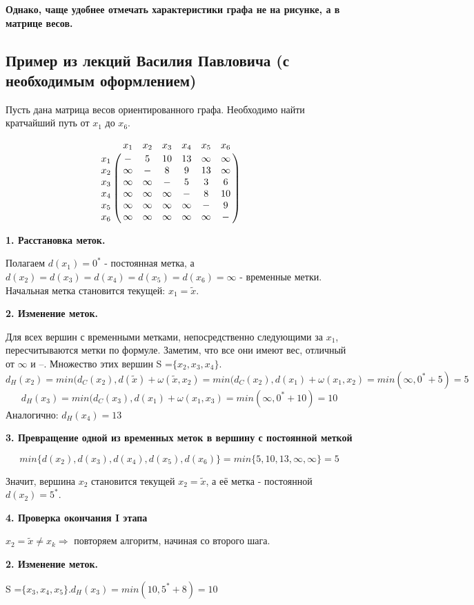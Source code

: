 \documentclass[12pt, a4paper, oneside]{article}
\theoremstyle{plain} %
\theoremstyle{definition}
\begin{document}
\textbf{
Однако, чаще удобнее отмечать характеристики графа не на рисунке, а в матрице весов.
}

\subsection*{Пример из лекций Василия Павловича (с необходимым оформлением)}

Пусть дана матрица весов ориентированного графа. Необходимо найти кратчайший путь от $x_1$ до $x_6$.

\[
 \bordermatrix{ & x_1 & x_2 & x_3 & x_4 & x_5 & x_6 \cr
  x_1 & - & 5 & 10 & 13 & \infty & \infty  \cr
  x_2 & \infty & - & 8 & 9 & 13 & \infty  \cr
  x_3 & \infty & \infty & - & 5 & 3 & 6   \cr
  x_4 & \infty & \infty & \infty & - & 8 & 10  \cr
  x_5 & \infty & \infty & \infty & \infty & - & 9  \cr
  x_6 & \infty & \infty & \infty & \infty & \infty & - } \qquad
\] 

\textbf{1. Расстановка меток.}

Полагаем $d(x_1) = 0^*$ - постоянная метка, а
$d(x_2) = d(x_3) = d(x_4) = d(x_5) = d(x_6) = \infty$ - временные метки. Начальная метка становится текущей: $x_1 = \tilde x$.

\textbf{2. Изменение меток.}

Для всех вершин с временными метками, непосредственно следующими за $x_1$, пересчитываются метки по формуле. Заметим, что все они имеют вес, отличный от $\infty$ и --.
Множество этих вершин S =$\{ x_2, x_3, x_4 \}$.
\[ d_H(x_2) = min(d_C(x_2), d(\tilde x) + \omega(\tilde x, x_2 ) = min(d_C(x_2), d(x_1) + \omega(x_1, x_2 ) = min(\infty, 0^* + 5 ) = 5  \]
\[ d_H(x_3) = min(d_C(x_3), d(x_1) + \omega(x_1, x_3 ) = min(\infty, 0^* + 10 ) = 10  \]
Аналогично: $d_H(x_4) = 13$

\textbf{3. Превращение одной из временных меток в вершину с постоянной меткой }

\[ min\{d(x_2),d(x_3),d(x_4),d(x_5),d(x_6)\} = min\{5,10,13,\infty,\infty\} = 5 \]

Значит, вершина $x_2$ становится текущей $x_2 = \tilde x$, а её метка - постоянной $d(x_2) = 5^*$.

\textbf{4. Проверка окончания I этапа }

$x_2 = \tilde x \neq x_k \Rightarrow$ повторяем алгоритм, начиная со второго шага.

\textbf{2. Изменение меток.} 

S =$\{ x_3, x_4, x_5 \}. d_H(x_3) = min(10, 5^* + 8 ) = 10 $
\end{document}
